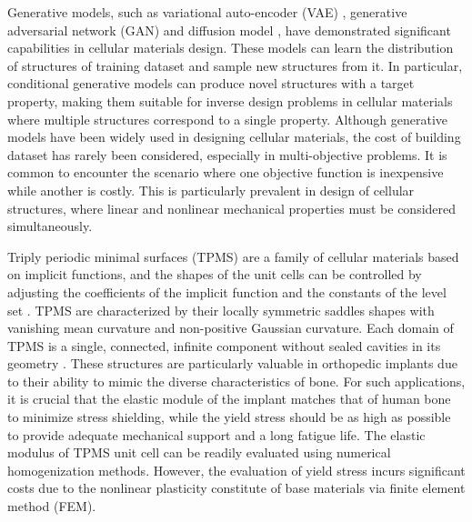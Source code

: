 \documentclass[preprint,review,12pt,authoryear]{elsarticle}
\begin{document}
Generative models, such as variational auto-encoder (VAE) \citep{Wang2020a,Zheng2023},  generative adversarial network (GAN) \citep{Nie2020, Shen2022,Kim2020b} and diffusion model \citep{Bastek2023,Maze2022,Vlassis2023}, have demonstrated significant capabilities in cellular materials design. These models can learn the distribution of structures of training dataset and sample new structures from it. In particular, conditional generative models can produce novel structures with a target property, making them suitable for inverse design problems in cellular materials where multiple structures correspond to a single property. Although generative models have been widely used in designing cellular materials, the cost of building dataset has rarely been considered, especially in multi-objective problems. It is common to encounter the scenario where one objective function is inexpensive while another is costly. This is particularly prevalent in design of cellular structures, where linear and nonlinear mechanical properties must be considered simultaneously.

Triply periodic minimal surfaces (TPMS) are a family of cellular materials based on implicit functions, and the shapes of the unit cells can be controlled by adjusting the coefficients of the implicit function and the constants of the level set \citep{Ma2020a}. TPMS are characterized by their locally symmetric saddles shapes with vanishing mean curvature and non-positive Gaussian curvature. Each domain of TPMS is a single, connected, infinite component without sealed cavities in its geometry \citep{Kapfer2011}. These structures are particularly valuable in orthopedic implants due to their ability to mimic the diverse characteristics of bone. For such applications, it is crucial that the elastic module of the implant matches that of human bone to minimize stress shielding, while the yield stress should be as high as possible to provide adequate mechanical support and a long fatigue life. The elastic modulus of TPMS unit cell can be readily evaluated using numerical homogenization methods. However, the evaluation of yield stress incurs significant costs due to the nonlinear plasticity constitute of base materials via finite element method (FEM).
\end{document}
